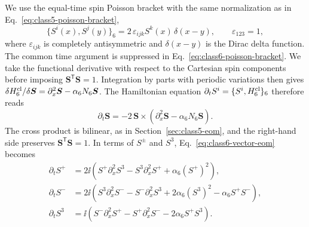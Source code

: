 We use the equal-time spin Poisson bracket with the same normalization as in
Eq.~\eqref{eq:class5-poisson-bracket},
\begin{equation}
\{S^i(x),S^j(y)\}_6
=2\,\varepsilon_{ijk}S^k(x)\,\delta(x-y),
\qquad \varepsilon_{123}=1,
\label{eq:class6-poisson-bracket}
\end{equation}
where $\varepsilon_{ijk}$ is completely antisymmetric and $\delta(x-y)$
is the Dirac delta function.  The common time argument is suppressed
in Eq.~\eqref{eq:class6-poisson-bracket}.
We take the functional derivative with respect to the Cartesian spin
components before imposing $\boldsymbol S^{\mathsf T}\boldsymbol S=1$.
Integration by parts with periodic variations then gives
$\delta H^{\rm cl}_6/\delta\boldsymbol S
=\partial_x^2\boldsymbol S-\alpha_6N_6\boldsymbol S$.
The Hamiltonian equation
$\partial_tS^i=\{S^i,H^{\rm cl}_6\}_6$ therefore reads
\begin{equation}
\partial_t\boldsymbol S
=-2\,\boldsymbol S\times
\left(\partial_x^2\boldsymbol S-\alpha_6N_6\boldsymbol S\right).
\label{eq:class6-vector-eom}
\end{equation}
The cross product is bilinear, as in
Section~\ref{sec:class5-eom}, and the right-hand side preserves
$\boldsymbol S^{\mathsf T}\boldsymbol S=1$.
In terms of $S^\pm$ and $S^3$, Eq.~\eqref{eq:class6-vector-eom} becomes
\begin{align}
\partial_tS^+
&=2\ii\left(
S^+\partial_x^2S^3-S^3\partial_x^2S^+
+\alpha_6(S^+)^2
\right),
\label{eq:class6-eom-plus}\\
\partial_tS^-
&=2\ii\left(
S^3\partial_x^2S^--S^-\partial_x^2S^3
+2\alpha_6(S^3)^2-\alpha_6S^+S^-
\right),
\label{eq:class6-eom-minus}\\
\partial_tS^3
&=\ii\left(
S^-\partial_x^2S^+-S^+\partial_x^2S^-
-2\alpha_6S^+S^3
\right).
\label{eq:class6-eom-three}
\end{align}

